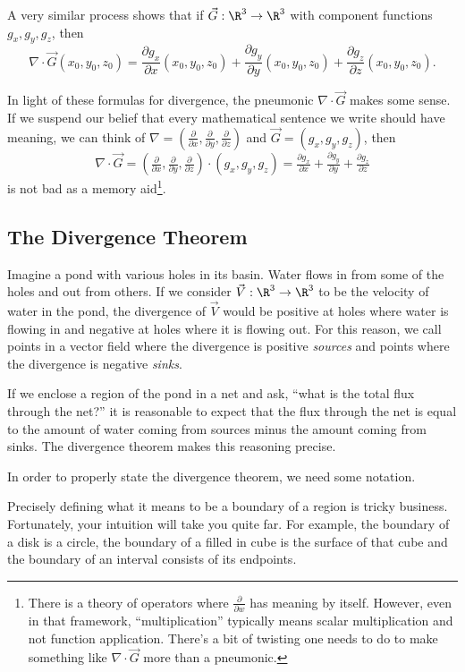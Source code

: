 A very similar process shows that if $\vec G:\R^3\to\R^3$ with component functions
$g_x,g_y,g_z$, then
\[
	\nabla \cdot \vec G(x_0,y_0,z_0) = \frac{\partial g_x}{\partial x}(x_0,y_0,z_0)
	+ \frac{\partial g_y}{\partial y}(x_0,y_0, z_0) + \frac{\partial g_z}{\partial z}(x_0,y_0, z_0).
\]

In light of these formulas for divergence, the
pneumonic $\nabla \cdot \vec G$ makes some sense.  If we suspend our belief
that every mathematical sentence we write should have meaning, we can think of 
$\nabla =(\tfrac{\partial}{\partial x},\tfrac{\partial}{\partial y},\tfrac{\partial}{\partial z})$
and $\vec G=(g_x,g_y,g_z)$, then
\[
	\nabla \cdot \vec G=(\tfrac{\partial}{\partial x},\tfrac{\partial}{\partial y},\tfrac{\partial}{\partial z})
	\cdot 
	(g_x,g_y,g_z)
	=\tfrac{\partial g_x}{\partial x}+\tfrac{\partial g_y}{\partial y}+\tfrac{\partial g_z}{\partial z}
\]
is not bad as a memory aid\footnote{ There is a theory of operators where $\tfrac{\partial }{\partial w}$
has meaning by itself.  However, even in that framework, ``multiplication'' typically means 
scalar multiplication and not function application.  There's a bit of twisting one needs to do
to make something like $\nabla \cdot \vec G$ more than a pneumonic.}.  


\subsection{The Divergence Theorem}

Imagine a pond with various holes in its basin. Water flows in
from some of the holes and out from others.  If we consider $\vec V:\R^3\to\R^3$
to be the velocity of water in the pond, the divergence of $\vec V$ would
be positive at holes where water is flowing in and negative 
at holes where it is flowing out.  For this reason, we call points in a vector
field where the divergence is positive \emph{sources}
and points where the divergence is negative \emph{sinks}.

If we enclose a region of the pond in a net and ask, ``what is the total
flux through the net\mbox{?}'' it is reasonable to expect that the flux
through the net is equal to the amount of water coming from sources minus
the amount coming from sinks.  The divergence theorem makes this reasoning
precise.

In order to properly state the divergence theorem, we need some notation.

\DefBoundary

Precisely defining what it means to be a boundary
of a region is tricky business.  Fortunately, your intuition will take you quite far.
For example, the boundary of a disk is a circle, the boundary of a filled in cube
is the surface of that cube and the boundary of an interval consists of its endpoints.

